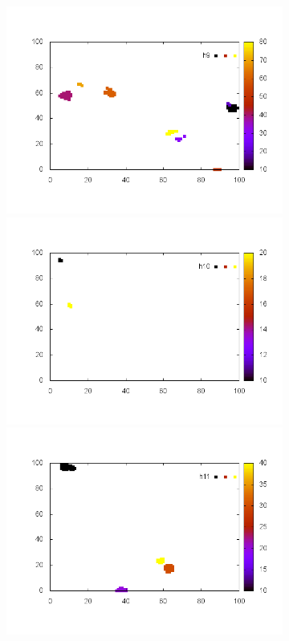 \documentclass[10pt,a4paper]{article}
\begin{document}
\begin{figure}
\begin{subfigure}[b]{1\textwidth}
\end{subfigure}
\begin{subfigure}[b]{1\textwidth}
\includegraphics[scale=.3]{./img/SCC_Stable3/cut95p/9.png}
\includegraphics[scale=.3]{./img/SCC_Stable3/cut95p/10.png}
\includegraphics[scale=.3]{./img/SCC_Stable3/cut95p/11.png}

\end{subfigure}
\end{figure}
\end{document}
